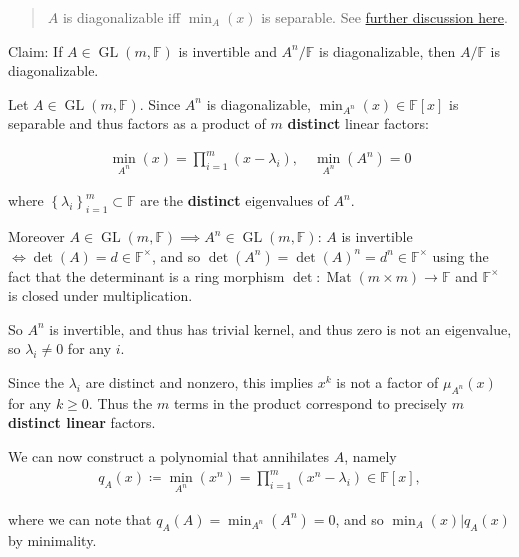 \begin{solution}

\begin{quote}
\(A\) is diagonalizable iff \(\min_A(x)\) is separable. See
\href{https://math.stackexchange.com/questions/3027664/if-a-is-invertible-and-an-is-diagonalizable-then-a-is-diagonalizable}{further
discussion here}.
\end{quote}

Claim: If \(A \in \operatorname{GL}(m, {\mathbb{F}})\) is invertible and
\(A^n/{\mathbb{F}}\) is diagonalizable, then \(A/{\mathbb{F}}\) is
diagonalizable.

Let \(A \in \operatorname{GL}(m, {\mathbb{F}})\). Since \(A^n\) is
diagonalizable, \(\min_{A^n}(x) \in {\mathbb{F}}[x]\) is separable and
thus factors as a product of \(m\) \textbf{distinct} linear factors:

\begin{align*}
\min_{A^n}(x) = \prod_{i=1}^m (x-\lambda_i), \quad \min_{A^n}(A^n) = 0
\end{align*}

where \(\left\{{\lambda_i}\right\}_{i=1}^m \subset {\mathbb{F}}\) are
the \textbf{distinct} eigenvalues of \(A^n\).

Moreover
\(A\in \operatorname{GL}(m,{\mathbb{F}}) \implies A^n \in \operatorname{GL}(m,{\mathbb{F}})\):
\(A\) is invertible \(\iff \det(A) = d \in {\mathbb{F}}^{\times}\), and
so \(\det(A^n) = \det(A)^n = d^n \in {\mathbb{F}}^{\times}\) using the
fact that the determinant is a ring morphism
\(\det: \operatorname{Mat}(m\times m) \to{\mathbb{F}}\) and
\({\mathbb{F}}^{\times}\) is closed under multiplication.

So \(A^n\) is invertible, and thus has trivial kernel, and thus zero is
not an eigenvalue, so \(\lambda_i \neq 0\) for any \(i\).

Since the \(\lambda_i\) are distinct and nonzero, this implies \(x^k\)
is not a factor of \(\mu_{A^n}(x)\) for any \(k\geq 0\). Thus the \(m\)
terms in the product correspond to precisely \(m\) \textbf{distinct
linear} factors.

We can now construct a polynomial that annihilates \(A\), namely
\begin{align*}
q_A(x) \coloneqq\min_{A^n}(x^n) = \prod_{i=1}^m (x^n-\lambda_i) \in {\mathbb{F}}[x],
\end{align*}

where we can note that \(q_A(A) = \min_{A^n}(A^n) = 0\), and so
\(\min_A(x) \mathrel{\Big|}q_A(x)\) by minimality.


\end{solution}

